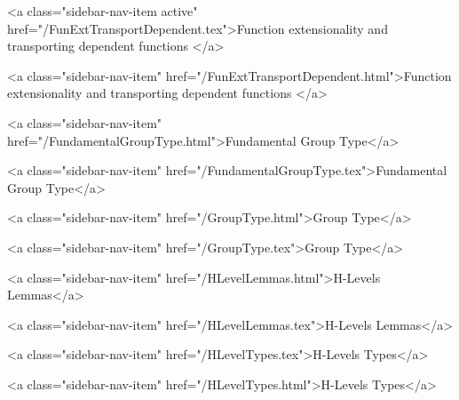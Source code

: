       
    
      
        
          <a class="sidebar-nav-item active" href="/FunExtTransportDependent.tex">Function extensionality and transporting dependent functions </a>
        
      
    
      
        
          <a class="sidebar-nav-item" href="/FunExtTransportDependent.html">Function extensionality and transporting dependent functions </a>
        
      
    
      
        
          <a class="sidebar-nav-item" href="/FundamentalGroupType.html">Fundamental Group Type</a>
        
      
    
      
        
          <a class="sidebar-nav-item" href="/FundamentalGroupType.tex">Fundamental Group Type</a>
        
      
    
      
        
          <a class="sidebar-nav-item" href="/GroupType.html">Group Type</a>
        
      
    
      
        
          <a class="sidebar-nav-item" href="/GroupType.tex">Group Type</a>
        
      
    
      
        
          <a class="sidebar-nav-item" href="/HLevelLemmas.html">H-Levels Lemmas</a>
        
      
    
      
        
          <a class="sidebar-nav-item" href="/HLevelLemmas.tex">H-Levels Lemmas</a>
        
      
    
      
        
          <a class="sidebar-nav-item" href="/HLevelTypes.tex">H-Levels Types</a>
        
      
    
      
        
          <a class="sidebar-nav-item" href="/HLevelTypes.html">H-Levels Types</a>
        
      
    
      
        
